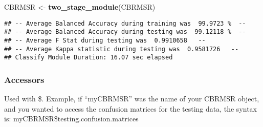 \documentclass[
]{article}
\newenvironment{Shaded}{\begin{snugshade}}{\end{snugshade}}
\newcommand{\KeywordTok}[1]{\textcolor[rgb]{0.13,0.29,0.53}{\textbf{#1}}}
\newcommand{\NormalTok}[1]{#1}
\newcommand{\StringTok}[1]{\textcolor[rgb]{0.31,0.60,0.02}{#1}}
\begin{document}
\begin{Shaded}
\begin{Highlighting}[]
\NormalTok{CBRMSR <-}\StringTok{ }\KeywordTok{two_stage_module}\NormalTok{(CBRMSR)}
\end{Highlighting}
\end{Shaded}

\begin{verbatim}
## -- Average Balanced Accuracy during training was  99.9723 %  -- 
## -- Average Balanced Accuracy during testing was  99.12118 %  -- 
## -- Average F Stat during testing was  0.9910658   -- 
## -- Average Kappa statistic during testing was  0.9581726   -- 
## Classify Module Duration: 16.07 sec elapsed
\end{verbatim}

\hypertarget{accessors}{%
\subsubsection{Accessors}\label{accessors}}

Used with \$. Example, if ``myCBRMSR'' was the name of your CBRMSR
object, and you wanted to access the confusion matrices for the testing
data, the syntax is: myCBRMSR\$testing.confusion.matrices
\end{document}
